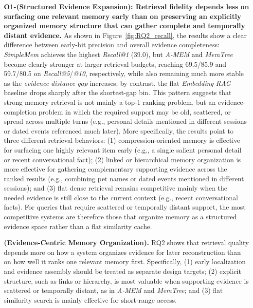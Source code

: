 \documentclass{llmxive}
\begin{document}
\noindent \textbf{O1-(Structured Evidence Expansion): Retrieval fidelity depends less on surfacing one relevant memory early than on preserving an explicitly organized memory structure that can gather complete and temporally distant evidence.}
As shown in Figure~\ref{fig:RQ2_recall}, the results show a clear difference between early-hit precision and overall evidence completeness: \textit{SimpleMem} achieves the highest \textit{Recall@1} (39.0), but \textit{A-MEM} and \textit{MemTree} become clearly stronger at larger retrieval budgets, reaching 69.5/85.9 and 59.7/80.5 on \textit{Recall@5}/\textit{@10}, respectively, while also remaining much more stable as the \textit{evidence distance gap} increases; by contrast, the flat \textit{Embedding RAG} baseline drops sharply after the shortest-gap bin.
This pattern suggests that strong memory retrieval is not mainly a top-1 ranking problem, but an evidence-completion problem in which the required support may be old, scattered, or spread across multiple turns (e.g., personal details mentioned in different sessions or dated events referenced much later).
More specifically, the results point to three different retrieval behaviors:
(1) compression-oriented memory is effective for surfacing one highly relevant item early (e.g., a single salient personal detail or recent conversational fact);
(2) linked or hierarchical memory organization is more effective for gathering complementary supporting evidence across the ranked results (e.g., combining pet names or dated events mentioned in different sessions);
and (3) flat dense retrieval remains competitive mainly when the needed evidence is still close to the current context (e.g., recent conversational facts).
For queries that require scattered or temporally distant support, the most competitive systems are therefore those that organize memory as a structured evidence space rather than a flat similarity cache.

\begin{findingbox}
\textbf{(Evidence-Centric Memory Organization).} RQ2 shows that retrieval quality depends more on how a system organizes evidence for later reconstruction than on how well it ranks one relevant memory first.
Specifically, (1) early localization and evidence assembly should be treated as separate design targets;
(2) explicit structure, such as links or hierarchy, is most valuable when supporting evidence is scattered or temporally distant, as in \textit{A-MEM} and \textit{MemTree};
and (3) flat similarity search is mainly effective for short-range access. 
\end{findingbox}
\end{document}
